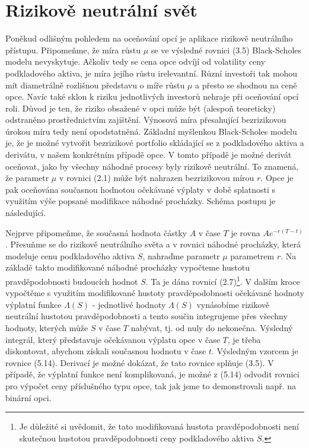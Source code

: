 \documentclass[a4paper]{book}
\begin{document}
\section{Rizikově neutrální svět}

Poněkud odlišným pohledem na oceňování opcí je aplikace rizikově neutrálního přístupu. Připomeňme, že míra růstu $\mu$ se ve výsledné rovnici (3.5) Black-Scholes modelu nevyskytuje. Ačkoliv tedy se cena opce odvíjí od volatility ceny podkladového aktiva, je míra jejího růstu irelevantní. Různí investoři tak mohou mít diametrálně rozlišnou představu o míře růstu $\mu$ a přesto se shodnou na ceně opce. Navíc také sklon k riziku jednotlivých investorů nehraje při oceňování opcí roli. Důvod je ten, že riziko obsažené v opci může být (alespoň teoreticky) odstraněno prostřednictvím zajištění. Výnosová míra přesahující bezrizikovou úrokou míru tedy není opodstatněná. Základní myšlenkou Black-Scholes modelu je, že je možné vytvořit bezrizikové portfolio skládající se z podkladového aktiva a derivátu, v našem konkrétním případě opce. V tomto případě je možné derivát oceňovat, jako by všechny náhodné procesy byly rizikově neutrální. To znamená, že parametr $\mu$ v rovnici (2.1) může být nahrazen bezrizikovou mírou $r$. Opce je pak oceňována současnou hodnotou očekávané výplaty v době splatnosti s využitím výše popsané modifikace náhodné procházky. Schéma postupu je následující.

Nejprve připomeňme, že současná hodnota částky $A$ v čase $T$ je rovna $Ae^{-r(T-t)}$. Přesuňme se do rizikově neutrálního světa a v rovnici náhodné procházky, která modeluje cenu podkladového aktiva $S$, nahraďme parametr $\mu$ parametrem $r$. Na základě takto modifikované náhodné procházky vypočteme hustotu pravděpodobnosti budoucích hodnot $S$. Ta je dána rovnicí (2.7)\footnote{Je důležité si uvědomit, že tato modifikovaná hustota pravděpodobnosti není skutečnou hustotou pravděpodobnosti ceny podkladového aktiva $S$.}. V dalším kroce vypočtěme s využitím modifikované hustoty pravděpodobnosti očekávané hodnoty výplatní funkce $\Lambda(S)$ - jednotlivé hodnoty $\Lambda(S)$ vynásobíme rizikově neutrální hustotou pravděpodobnosti a tento součin integrujeme přes všechny hodnoty, kterých může $S$ v čase $T$ nabývat, tj. od nuly do nekonečna. Výsledný integrál, který představuje očekávanou výplatu opce v čase $T$, je třeba diskontovat, abychom získali současnou hodnotu v čase $t$. Výsledným vzorcem je rovnice (5.14). Derivací je možné dokázat, že tato rovnice splňuje (3.5). V případě, že výplatní funkce není komplikovaná, je možné z (5.14) odvodit rovnici pro výpočet ceny příslušného typu opce, tak jak jsme to demonstrovali např. na binární opci.
\end{document}
